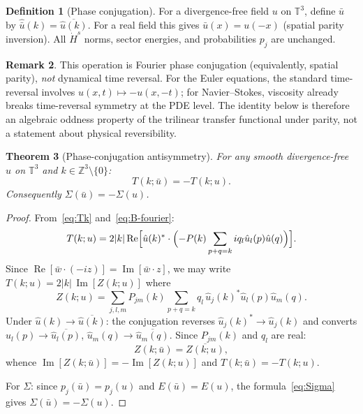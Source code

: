 \documentclass[11pt]{article}
\newtheorem{theorem}{Theorem}[section]
\theoremstyle{definition}
\newtheorem{definition}[theorem]{Definition}
\newtheorem{remark}[theorem]{Remark}
\newcommand{\T}{\mathbb{T}}
\newcommand{\Z}{\mathbb{Z}}
\newcommand{\Hdot}[1]{\dot{H}^{#1}}
\DeclareMathOperator{\re}{Re}
\DeclareMathOperator{\im}{Im}
\begin{document}
\begin{definition}[Phase conjugation]
\label{def:conj}
For a divergence-free field $u$ on $\T^3$, define
$\bar u$ by $\hat{\bar u}(k) = \overline{\hat u(k)}$.
For a real field this gives $\bar u(x)=u(-x)$ (spatial
parity inversion).  All $\Hdot{s}$ norms, sector energies,
and probabilities $p_j$ are unchanged.
\end{definition}

\begin{remark}
This operation is Fourier phase conjugation (equivalently,
spatial parity), \emph{not} dynamical time reversal.
For the Euler equations, the standard time-reversal
involves $u(x,t)\mapsto -u(x,-t)$; for Navier--Stokes,
viscosity already breaks time-reversal symmetry at the
PDE level.  The identity below is therefore an algebraic
oddness property of the trilinear transfer functional
under parity, not a statement about physical reversibility.
\end{remark}

\begin{theorem}[Phase-conjugation antisymmetry]
\label{thm:antisym}
For any smooth divergence-free $u$ on $\T^3$ and
$k\in\Z^3\setminus\{0\}$:
\begin{equation}
T(k;\bar u) = -T(k;u).
\end{equation}
Consequently $\Sigma(\bar u) = -\Sigma(u)$.
\end{theorem}

\begin{proof}
From~\eqref{eq:Tk} and~\eqref{eq:B-fourier}:
\begin{equation}
T(k;u) = 2|k|\re\Bigl[\hat u(k)^*\cdot
\Bigl(-P(k)\sum_{p+q=k}iq_l\hat u_l(p)\hat u(q)
\Bigr)\Bigr].
\end{equation}
Since $\re[\bar w\cdot(-iz)] = \im[\bar w\cdot z]$,
we may write $T(k;u) = 2|k|\,\im[Z(k;u)]$ where
\begin{equation}\label{eq:Z}
Z(k;u) = \sum_{j,l,m}P_{jm}(k)\sum_{p+q=k}
q_l\,\hat u_j(k)^*\hat u_l(p)\hat u_m(q).
\end{equation}
Under $\hat u(k)\to\overline{\hat u(k)}$: the conjugation
reverses $\hat u_j(k)^*\to\hat u_j(k)$ and converts
$\hat u_l(p)\to\overline{\hat u_l(p)}$,
$\hat u_m(q)\to\overline{\hat u_m(q)}$.  Since $P_{jm}(k)$
and $q_l$ are real:
\begin{equation}
Z(k;\bar u) = \overline{Z(k;u)},
\end{equation}
whence $\im[Z(k;\bar u)]=-\im[Z(k;u)]$ and
$T(k;\bar u)=-T(k;u)$.

For $\Sigma$: since $p_j(\bar u) = p_j(u)$ and
$E(\bar u) = E(u)$, the formula~\eqref{eq:Sigma}
gives $\Sigma(\bar u) = -\Sigma(u)$.
\end{proof}
\end{document}
